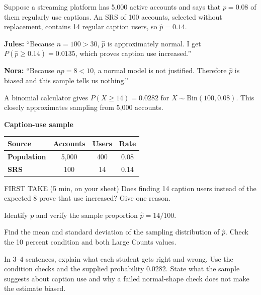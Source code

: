 \documentclass[14pt]{extarticle}
\begin{document}
\pagestyle{empty}


\noindent\begin{minipage}[t]{0.57\linewidth}
\vspace{0pt}
Suppose a streaming platform has 5,000 active accounts and says that $p=0.08$ of them regularly use captions. An SRS of 100 accounts, selected without replacement, contains 14 regular caption users, so $\widehat p=0.14$.\par\smallskip \textbf{Jules:} ``Because $n=100>30$, $\widehat p$ is approximately normal. I get $P(\widehat p\geq0.14)=0.0135$, which proves caption use increased.''\par \textbf{Nora:} ``Because $np=8<10$, a normal model is not justified. Therefore $\widehat p$ is biased and this sample tells us nothing.''\par\smallskip A binomial calculator gives $P(X\geq14)=0.0282$ for $X\sim\mathrm{Bin}(100,0.08)$. This closely approximates sampling from 5,000 accounts.\par
\end{minipage}\hfill
\begin{minipage}[t]{0.40\linewidth}
\vspace{0pt}
\begin{center}
\textbf{Caption-use sample}\par\smallskip
\begin{tabular}{|l|c|c|c|}
\hline
\textbf{Source} & \textbf{Accounts} & \textbf{Users} & \textbf{Rate} \\ \hline
\textbf{Population} & 5,000 & 400 & 0.08 \\ \hline
\textbf{SRS} & 100 & 14 & 0.14 \\ \hline
\end{tabular}
\end{center}
\end{minipage}

\begin{firsttakebox}{FIRST TAKE (5 min, on your sheet)}
Does finding 14 caption users instead of the expected 8 prove that use increased? Give one reason.
\end{firsttakebox}

\begin{description}[leftmargin=1.15in, labelwidth=1in, itemsep=2pt, topsep=2pt]
  \item[\dokbadge{1}~(a)] Identify $p$ and verify the sample proportion $\widehat p=14/100$.
  \item[\dokbadge{2}~(b)] Find the mean and standard deviation of the sampling distribution of $\widehat p$. Check the 10 percent condition and both Large Counts values.
  \item[\dokbadge{3}~(c)] In 3--4 sentences, explain what each student gets right and wrong. Use the condition checks and the supplied probability 0.0282. State what the sample suggests about caption use and why a failed normal-shape check does not make the estimate biased.
\end{description}
\end{document}
